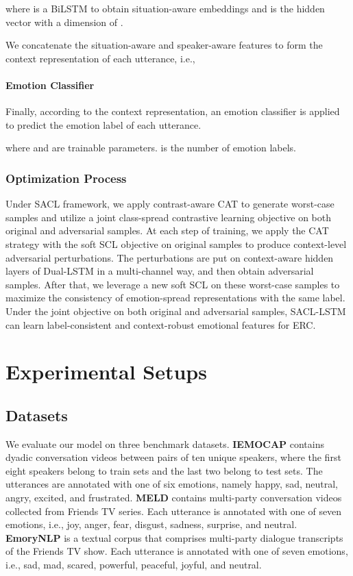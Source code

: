 \documentclass[11pt]{article}
\begin{document}
where  is a BiLSTM to obtain situation-aware embeddings and  is the hidden vector with a dimension of .  

We concatenate the situation-aware and speaker-aware features to form the context representation of each utterance, i.e.,


\paragraph{Emotion Classifier} \label{sec:emo}
Finally, according to the context representation, an emotion classifier is applied to predict the emotion label of each utterance. 
 
where  and  
are trainable parameters.
 is the number of emotion labels.



\subsubsection{Optimization Process} 
Under SACL framework, we apply contrast-aware CAT to generate worst-case samples and utilize a joint class-spread contrastive learning objective on both original and adversarial samples. 
At each step of training, we apply the CAT strategy with the soft SCL objective on original samples to produce context-level adversarial perturbations.
The perturbations are put on context-aware hidden layers of Dual-LSTM in a multi-channel way, and then obtain adversarial samples.
After that, we leverage a new soft SCL on these worst-case  samples to maximize the consistency of emotion-spread representations with the same label.
Under the joint objective on both original and adversarial samples, SACL-LSTM can learn label-consistent and context-robust emotional features for ERC.


\section{Experimental Setups}
\subsection{Datasets}
We evaluate our model on three benchmark datasets.
\textbf{IEMOCAP} \cite{DBLP:journals/lre/BussoBLKMKCLN08} contains dyadic conversation videos between pairs of ten unique speakers, where the first eight speakers belong to train sets and the last two belong to test sets.
The utterances are annotated with one of six emotions, namely happy, sad, neutral, angry, excited, and frustrated. 
\textbf{MELD} \cite{DBLP:conf/acl/PoriaHMNCM19} contains multi-party conversation videos collected from Friends TV series. Each utterance is annotated with one of seven emotions, i.e., joy, anger, fear, disgust, sadness, surprise, and neutral.
\textbf{EmoryNLP} \cite{DBLP:conf/aaai/ZahiriC18} is a textual corpus that comprises multi-party dialogue transcripts of the Friends TV show. Each utterance is annotated with one of seven emotions, 
i.e., sad, mad, scared, powerful, peaceful, joyful, and neutral.
\end{document}
